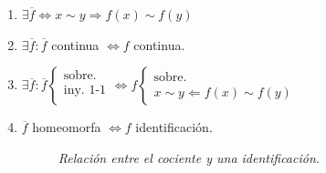 \begin{prop}
\begin{enumerate}
    \item $\exists \overline{f} \Leftrightarrow x \sim y \Rightarrow f\left( x \right) \sim f\left( y \right)$
    \item $\exists \overline{f} : \overline{f}$ continua $\Leftrightarrow f$ continua.
    \item $\exists \overline{f}: \overline{f} \begin{cases}
        \text{sobre. }\\ 
        \text{iny. 1-1}\\ 
    \end{cases} \Leftrightarrow f \begin{cases}
        \text{sobre.}\\ 
        x \sim y \Leftarrow f \left( x \right) \sim f \left( y \right)
    \end{cases}$

    \item $\overline{f}$ homeomorfa $\Leftrightarrow f$ identificación.
    \begin{figure}[H]
        \centering
        \caption{\textit{Relación entre el cociente y una identificación.}}
        \label{fig:relacion_cociente_identificacion}
    \end{figure}
\end{enumerate} 
\end{prop}
